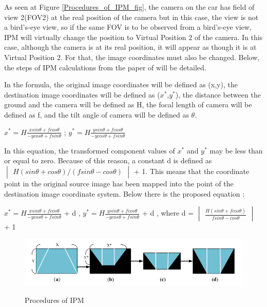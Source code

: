  As seen at Figure \ref{Procedures_of_IPM_fig}, the camera on the car has field of view 2(FOV2) at the real position of the camera but in this case, the view is not a bird's-eye view, so if the same FOV is to be observed from a bird's-eye view, IPM will virtually change the position to Virtual Position 2 of the camera. In this case, although the camera is at its real position, it will appear as though it is at Virtual Position 2. For that, the image coordinates must also be changed. Below, the steps of IPM calculations from the paper of \cite{IPM} will be detailed.
 
In the formula, the original image coordinates will be defined as (x,y), the destination image coordinates will be defined as ($x^*$,$y^*$), the distance between the ground and the camera will be defined as H, the focal length of camera will be defined as f, and the tilt angle of camera will be defined as $\theta$.
 
\begin{center}
 $x^* = H \frac{x sin \theta + f cos \theta}{-y cos \theta + f sin \theta}$ ;
 $y^* = H \frac{y sin \theta + f cos \theta}{-y cos \theta + f sin \theta}$ 
\end{center}

In this equation, the transformed component values of $x^*$ and $y^*$ may be less than or equal to zero. Because of 
this reason, a constant d is defined as $
\begin{vmatrix}
H(sin \theta + cos \theta)/(f sin \theta - cos \theta) 
\end{vmatrix}
$  + 1. This means that the coordinate point in the original source image has been mapped into the point of the destination image coordinate system. Below there is the proposed equation :
 
 \begin{center}
 $x^* = H \frac{x sin \theta + f cos \theta}{-y cos \theta + f sin \theta}$ + d ,
 $y^* = H \frac{y sin \theta + f cos \theta}{-y cos \theta + f sin \theta}$ + d ,
 where d = 
 $\begin{vmatrix}
 \frac{H(sin \theta + f cos \theta)}{f sin \theta - cos \theta}
 \end{vmatrix}$ + 1
\end{center}

\begin{figure}[H]
 \centering
  \includegraphics[width=1\textwidth]{./Bilder/Procedures_of_IPM.png}\label{Procedures_of_IPM}
  \caption{Procedures of IPM}
\end{figure}


